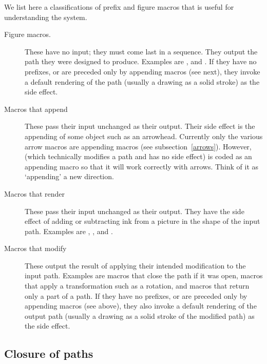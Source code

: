 \documentclass[letterpaper]{article}
\begin{document}
We list here a classifications of prefix and figure macros that is
useful for understanding the \mfp{} system.

\begin{description}

\item[Figure macros.] These have no input; they must
    come last in a sequence. They output the path they were designed to
    produce. Examples are ,  and . If
    they have no prefixes, or are preceded only by appending macros (see
    next), they invoke a default rendering of the path (usually a
    drawing as a solid stroke) as the side effect.

\item[Macros that append] These pass their input
    unchanged as their output. Their side effect is the appending of
    some object such as an arrowhead. Currently only the various arrow
    macros are appending macros (see subsection~\ref{arrows}). However,
     (which technically modifies a path and has no side
    effect) is coded as an appending macro so that it will work
    correctly with arrows. Think of it as `appending' a new direction.

\item[Macros that render] These pass their
    input unchanged as their output. They have the side effect of adding
    or subtracting ink from a picture in the shape of the input path.
    Examples are , ,  and .

\item[Macros that modify] These output the result of
    applying their intended modification to the input path. Examples are
    macros that close the path if it was open, macros that apply a
    transformation such as a rotation, and macros that return only a
    part of a path. If they have no prefixes, or are preceded only by
    appending macros (see above), they also invoke a default rendering
    of the output path (usually a drawing as a solid stroke of the
    modified path) as the side effect.

\end{description}

\subsection{Closure of paths}\label{closure}
\end{document}
